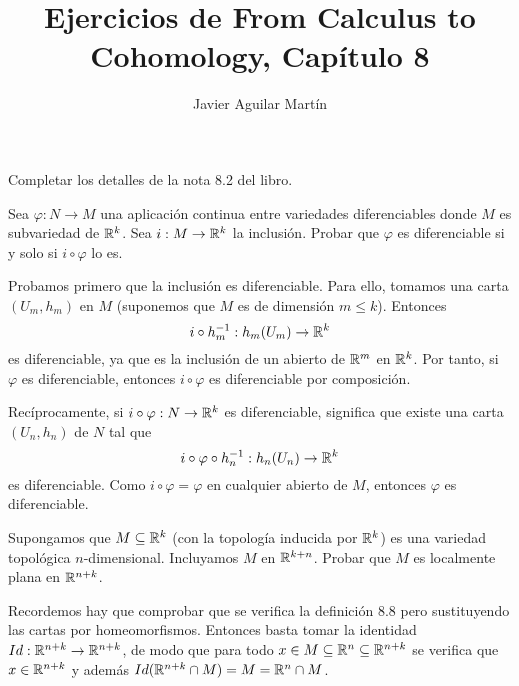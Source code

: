 \documentclass[twoside]{article}
\begin{document}
\title{Ejercicios de From Calculus to Cohomology, Capítulo 8}
\author{Javier Aguilar Martín}
\maketitle


\begin{ejercicio}{8.1}
Completar los detalles de la nota 8.2 del libro.
\end{ejercicio}
\begin{solucion}



\end{solucion}

\newpage

\begin{ejercicio}{8.2}
Sea $\varphi:N\to M$ una aplicación continua entre variedades diferenciables donde $M$ es subvariedad de $\mathbb{R}^k$. Sea $i:M\to \mathbb{R}^k$ la inclusión. Probar que $\varphi$ es diferenciable si y solo si $i\circ\varphi$ lo es.
\end{ejercicio}
\begin{solucion}
Probamos primero que la inclusión es diferenciable. Para ello, tomamos una carta $(U_m, h_m)$ en $M$ (suponemos que $M$ es de dimensión $m\leq k$). Entonces
\[
 i\circ h_m^{-1}: h_m(U_m)\to \mathbb{R}^k
\]
es diferenciable, ya que es la inclusión de un abierto de $\mathbb{R}^m$ en $\mathbb{R}^k$. Por tanto, si $\varphi$ es diferenciable, entonces $i\circ\varphi$ es diferenciable por composición. 

Recíprocamente, si $i\circ\varphi:N\to \mathbb{R}^k$ es diferenciable, significa que existe una carta $(U_n,h_n)$ de $N$ tal que
\[
i\circ\varphi\circ h_n^{-1}:h_n(U_n)\to\mathbb{R}^k
\]
es diferenciable. Como $i\circ\varphi=\varphi$ en cualquier abierto de $M$, entonces $\varphi$ es diferenciable.
\end{solucion}
\newpage

\begin{ejercicio}{8.3}
Supongamos que $M\subseteq\mathbb{R}^k$ (con la topología inducida por $\mathbb{R}^k$) es una variedad topológica $n$-dimensional. Incluyamos $M$ en $\mathbb{R}^{k+n}$. Probar que $M$ es localmente plana en $\mathbb{R}^{n+k}$.
\end{ejercicio}
\begin{solucion}
Recordemos hay que comprobar que se verifica la definición 8.8 pero sustituyendo las cartas por homeomorfismos. Entonces basta tomar la identidad $Id:\mathbb{R}^{n+k}\to\mathbb{R}^{n+k}$, de modo que para todo $x\in M\subseteq\mathbb{R}^n\subseteq\mathbb{R}^{n+k}$ se verifica que $x\in\mathbb{R}^{n+k}$ y además $Id(\mathbb{R}^{n+k}\cap M)=M=\mathbb{R}^n\cap M$.
\end{solucion}
\newpage
\end{document}
